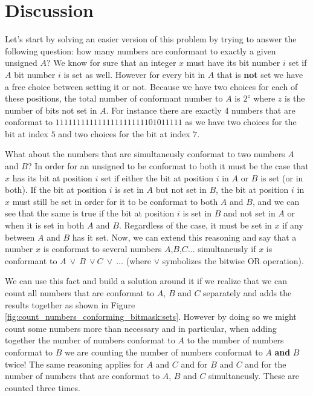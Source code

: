 \section{Discussion}
\label{count_numbers_conforming_bitmask:sec:discussion}
Let's start by solving an easier version of this problem by trying to answer the following question: how many numbers are conformant to exactly a given unsigned $A$?
We know for sure that an integer $x$ must have its bit number $i$ set if $A$ bit number $i$ is set as well. However for every bit in $A$  that is \textbf{not} set we have a free choice between setting it or not. 
Because we have two choices for each of these positions, the total number of conformant number to $A$ is $2^{z}$ where $z$ is the number of bits not set in $A$.
For instance there are exactly $4$ numbers that are conformat to $11 1111 1111 1111 1111 1111 0101 1111$ as we have two choices for the bit at index $5$ and two choices for the bit at index $7$.

What about the numbers that are simultaneusly conformat to two numbers $A$ and $B$? In order for an unsigned to be conformat to both it must be the case that $x$ has its bit at position $i$ set if either the bit at position $i$ in $A$ or $B$ is set (or in both).
If the bit at position $i$ is set in $A$ but not set in $B$, the bit at position $i$ in $x$ must still be set in order for it to be conformat to both $A$ and $B$, and we can see that the same is true if the bit at position $i$ is set in $B$ and not set in $A$ or when it is set in both $A$ and $B$. Regardless of the case, it must be set in $x$ if any between $A$ and $B$ has it set.
Now, we can extend this reasoning and say that a number $x$ is conformat to several numbers $A$,$B$,$C\ldots$ simultaneusly if $x$ is conformant to $A \: \vee \: B \: \vee C \:  \vee \: \ldots$ (where $\vee$ symbolizes the bitwise OR operation).

We can use this fact and build a solution around it if we realize that we can count all numbers that are conformat to $A$, $B$ and $C$ separately and adds the results together as shown in Figure \ref{fig:count_numbers_conforming_bitmask:sets}. However by doing so we might count some numbers more than necessary and in particular, when adding together the number of numbers conformat to $A$ to the number of numbers conformat to $B$ we are counting the number of numbers conformat to $A$ \textbf{and} $B$ twice! The same reasoning applies for $A$ and $C$ and for $B$ and $C$ and for the number of numbers that are conformat to $A$, $B$ and $C$ simultaneusly. These are counted three times.

